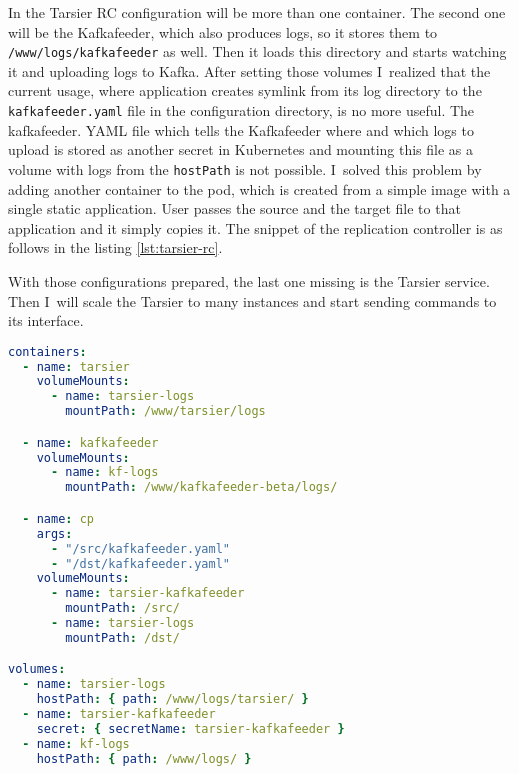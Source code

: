 In the Tarsier RC configuration will be more than one container. The second one will be the Kafkafeeder, which also produces logs, so it stores them to \lstinline{/www/logs/kafkafeeder} as well. Then it loads this directory and starts watching it and uploading logs to Kafka. After setting those volumes I~realized that the current usage, where application creates symlink from its log directory to the \lstinline{kafkafeeder.yaml} file in the configuration directory, is no more useful. The kafkafeeder. YAML file which tells the Kafkafeeder where and which logs to upload is stored as another secret in Kubernetes and mounting this file as a volume with logs from the \lstinline{hostPath} is not possible. I~solved this problem by adding another container to the pod, which is created from a simple image with a single static application. User passes the source and the target file to that application and it simply copies it. The snippet of the replication controller is as follows in the listing \ref{lst:tarsier-rc}.

With those configurations prepared, the last one missing is the Tarsier service. Then I~will scale the Tarsier to many instances and start sending commands to its interface.

\newpage
\begin{lstlisting}[language=yaml,caption={Snippet of replication controller configuration},label={lst:tarsier-rc}]
containers:
  - name: tarsier
    volumeMounts:
      - name: tarsier-logs
        mountPath: /www/tarsier/logs

  - name: kafkafeeder
    volumeMounts:
      - name: kf-logs
        mountPath: /www/kafkafeeder-beta/logs/

  - name: cp
    args:
      - "/src/kafkafeeder.yaml"
      - "/dst/kafkafeeder.yaml"
    volumeMounts:
      - name: tarsier-kafkafeeder
        mountPath: /src/
      - name: tarsier-logs
        mountPath: /dst/

volumes:
  - name: tarsier-logs
    hostPath: { path: /www/logs/tarsier/ }
  - name: tarsier-kafkafeeder
    secret: { secretName: tarsier-kafkafeeder }
  - name: kf-logs
    hostPath: { path: /www/logs/ }
\end{lstlisting}
